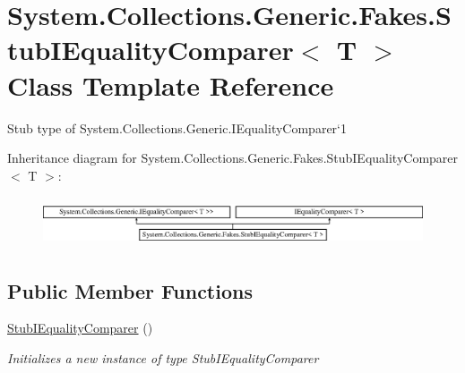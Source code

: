 \hypertarget{class_system_1_1_collections_1_1_generic_1_1_fakes_1_1_stub_i_equality_comparer_3_01_t_01_4}{\section{System.\-Collections.\-Generic.\-Fakes.\-Stub\-I\-Equality\-Comparer$<$ T $>$ Class Template Reference}
\label{class_system_1_1_collections_1_1_generic_1_1_fakes_1_1_stub_i_equality_comparer_3_01_t_01_4}
}


Stub type of System.\-Collections.\-Generic.\-I\-Equality\-Comparer`1 


Inheritance diagram for System.\-Collections.\-Generic.\-Fakes.\-Stub\-I\-Equality\-Comparer$<$ T $>$\-:\begin{figure}[H]
\begin{center}
\leavevmode
\includegraphics[height=1.489362cm]{class_system_1_1_collections_1_1_generic_1_1_fakes_1_1_stub_i_equality_comparer_3_01_t_01_4}
\end{center}
\end{figure}
\subsection*{Public Member Functions}
\begin{DoxyCompactItemize}
\item 
\hyperlink{class_system_1_1_collections_1_1_generic_1_1_fakes_1_1_stub_i_equality_comparer_3_01_t_01_4_a8207014c8b2092ce7d50c447724f888e}{Stub\-I\-Equality\-Comparer} ()
\begin{DoxyCompactList}\small\item\em Initializes a new instance of type Stub\-I\-Equality\-Comparer\end{DoxyCompactList}\end{DoxyCompactItemize}
